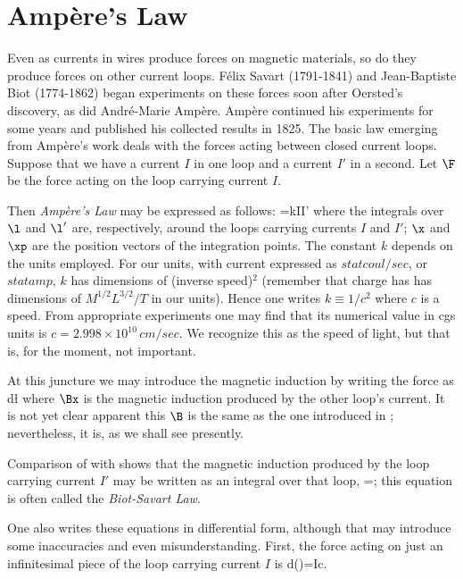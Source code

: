 \section{Amp\`ere's Law}
Even as currents in wires produce forces on magnetic materials, so do they
produce forces on other current loops.
F\'elix Savart (1791-1841) and Jean-Baptiste Biot (1774-1862)
began experiments on these forces soon after Oersted's discovery, as did
Andr\'e-Marie Amp\`ere. Amp\`ere continued his experiments for some years
and published his collected results in 1825. The basic law emerging from
Amp\`ere's work deals with the forces acting between closed current loops.
Suppose that we have a current $I$ in one loop and a current $I'$ in a
second. Let $\F$ be the force acting on the loop carrying current $I$.

\centerline{}

\noindent Then {\em Amp\`ere's Law} may be expressed as follows:
\beq
\F=kII'\int\int{}
\eeq
where the integrals over $\l$ and $\l'$ are, respectively, around the loops
carrying currents $I$ and $I'$; $\x$ and $\xp$ are the
position vectors of the integration points. The constant $k$ depends on the
units employed. For our units, with current expressed as $statcoul/sec$, or
$statamp$, $k$ has dimensions of (inverse speed)$^2$ (remember that charge
has has dimensions of $M^{1/2}L^{3/2}/T$ in our units). Hence one writes
$k\equiv1/c^2$ where $c$ is a speed. From appropriate experiments one may
find that its numerical value in cgs units is $c=2.998\times10^10\,cm/sec$.
We recognize this as the speed of light, but that is, for the moment, not
important.

At this juncture we may introduce the magnetic induction by writing the
force as
\beq
\F\equiv{}\int d\l\times\Bx
\eeq
where $\Bx$ is the magnetic induction produced by the other loop's current.
It is not yet clear apparent this $\B$ is the same as the one introduced in
; nevertheless, it is, as we shall see presently.

Comparison of  with  shows that the magnetic induction
produced by the loop carrying current $I'$ may be written as an integral over
that loop,
\beq
\Bx=\int{};
\eeq
this equation is often called the {\em Biot-Savart Law}.

One also writes these equations in differential form, although that may
introduce some inaccuracies and even misunderstanding. First, the force
acting on just an infinitesimal piece of the loop carrying current $I$ is
\beq
d\F(\x)=\frac Ic\dvl\times\Bx.
\eeq

